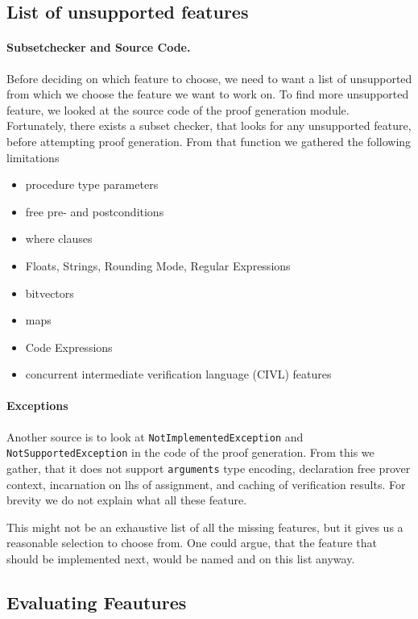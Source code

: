 \documentclass[11pt]{article}
\begin{document}
\subsection{List of unsupported features}

\paragraph{Subsetchecker and Source Code.} Before deciding on which feature to choose,
we need to want a list of unsupported from which we choose the feature we want to work on.
To find more unsupported feature, we looked at the source code of the proof generation module.
Fortunately, there exists a subset checker, that looks for any unsupported feature,
before attempting proof generation.
From that function we gathered the following limitations
\begin{itemize}
  \item procedure type parameters
  \item free pre- and postconditions
  \item where clauses
  \item Floats, Strings, Rounding Mode, Regular Expressions
  \item bitvectors
  \item maps
  \item Code Expressions
  \item concurrent intermediate verification language (CIVL) features
\end{itemize}

\paragraph{Exceptions} Another source is to look at \texttt{NotImplementedException} and \texttt{NotSupportedException}
in the code of the proof generation.
From this we gather, that it does not support \texttt{arguments} type encoding,
declaration free prover context, incarnation on lhs of assignment, and caching of verification results. For brevity we do not explain what all these feature.

This might not be an exhaustive list of all the missing features,
but it gives us a reasonable selection to choose from.
One could argue, that the feature that should be implemented next, would be named and on this list anyway.


\subsection{Evaluating Feautures}
\end{document}
